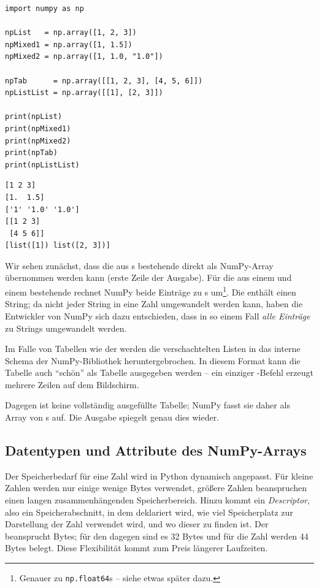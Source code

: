 \begin{codebox}
\begin{verbatim}
import numpy as np

npList   = np.array([1, 2, 3])
npMixed1 = np.array([1, 1.5])
npMixed2 = np.array([1, 1.0, "1.0"])

npTab      = np.array([[1, 2, 3], [4, 5, 6]])
npListList = np.array([[1], [2, 3]])

print(npList)
print(npMixed1)
print(npMixed2)
print(npTab)
print(npListList)
\end{verbatim}
\end{codebox}

\begin{cmdbox}
\begin{verbatim}
[1 2 3]
[1.  1.5]
['1' '1.0' '1.0']
[[1 2 3]
 [4 5 6]]
[list([1]) list([2, 3])]
\end{verbatim}
\end{cmdbox}

Wir sehen zunächst, dass die aus s bestehende  direkt als NumPy-Array übernommen werden kann (erste Zeile der Ausgabe). Für die aus einem  und einem  bestehende  rechnet NumPy beide Einträge zu s um\footnote{Genauer zu \texttt{np.float64}s -- siehe etwas später dazu.}. Die  enthält einen String; da nicht jeder String in eine Zahl umgewandelt werden kann, haben die Entwickler von NumPy sich dazu entschieden, dass in so einem Fall \emph{alle Einträge} zu Strings umgewandelt werden.

Im Falle von Tabellen wie der  werden die verschachtelten Listen in das interne Schema der NumPy-Bibliothek heruntergebrochen. In diesem Format kann die Tabelle auch \enquote{schön} als Tabelle ausgegeben werden -- ein einziger -Befehl erzeugt mehrere Zeilen auf dem Bildschirm.

Dagegen ist  keine vollständig ausgefüllte Tabelle; NumPy fasst sie daher als Array von s auf. Die Ausgabe spiegelt genau dies wieder.

\subsection{Datentypen und Attribute des NumPy-Arrays}
Der Speicherbedarf für eine Zahl wird in Python dynamisch angepasst. Für kleine Zahlen werden nur einige wenige Bytes verwendet, größere Zahlen beanspruchen einen langen zusammenhängenden Speicherbereich. Hinzu kommt ein \emph{Descriptor}, also ein Speicherabschnitt, in dem deklariert wird, wie viel Speicherplatz zur Darstellung der Zahl verwendet wird, und wo dieser zu finden ist. Der  beansprucht  Bytes; für den  dagegen sind es 32 Bytes und für die Zahl  werden 44 Bytes belegt. Diese Flexibilität kommt zum Preis längerer Laufzeiten.

